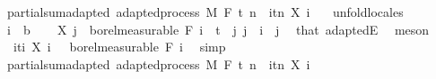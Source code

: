 \begin{isabellebody}
%
\endisadelimproof
\isanewline
\isanewline
{}\isamarkupfalse%
\ partial{\isacharunderscore}{\kern0pt}sum{\isacharunderscore}{\kern0pt}adapted{\isacharcolon}{\kern0pt}\ {\isachardoublequoteopen}adapted{\isacharunderscore}{\kern0pt}process\ M\ F\ t\ {\isacharparenleft}{\kern0pt}{\isasymlambda}n\ {\isasymxi}{\isachardot}{\kern0pt}\ {\isasymSum}i{\isasymin}{\isacharbraceleft}{\kern0pt}tn{\isacharbraceright}{\kern0pt}{\isachardot}{\kern0pt}\ X\ i\ {\isasymxi}{\isacharparenright}{\kern0pt}{\isachardoublequoteclose}\ \isanewline
%
\isadelimproof
%
\endisadelimproof
%
\isatagproof
{}\isamarkupfalse%
\ {\isacharparenleft}{\kern0pt}unfold{\isacharunderscore}{\kern0pt}locales{\isacharparenright}{\kern0pt}\isanewline
\ \ \isamarkupfalse%
\ i\ {\isacharcolon}{\kern0pt}{\isacharcolon}{\kern0pt}\ {\isacharprime}{\kern0pt}b\isanewline
\ \ \isamarkupfalse%
\ {\isachardoublequoteopen}X\ j\ {\isasymin}\ borel{\isacharunderscore}{\kern0pt}measurable\ {\isacharparenleft}{\kern0pt}F\ i{\isacharparenright}{\kern0pt}{\isachardoublequoteclose}\ \ {\isachardoublequoteopen}t\ {\isasymle}\ j{\isachardoublequoteclose}\ {\isachardoublequoteopen}j\ {\isasymle}\ i{\isachardoublequoteclose}\ \ j\ \isamarkupfalse%
\ that\ adaptedE\ \isamarkupfalse%
\ meson\isanewline
\ \ \isamarkupfalse%
\ {\isachardoublequoteopen}{\isacharparenleft}{\kern0pt}{\isasymlambda}{\isasymxi}{\isachardot}{\kern0pt}\ {\isasymSum}i{\isasymin}{\isacharbraceleft}{\kern0pt}ti{\isacharbraceright}{\kern0pt}{\isachardot}{\kern0pt}\ X\ i\ {\isasymxi}{\isacharparenright}{\kern0pt}\ {\isasymin}\ borel{\isacharunderscore}{\kern0pt}measurable\ {\isacharparenleft}{\kern0pt}F\ i{\isacharparenright}{\kern0pt}{\isachardoublequoteclose}\ \isamarkupfalse%
\ simp\isanewline
{}\isamarkupfalse%
%
\endisatagproof
{\isafoldproof}%
%
\isadelimproof
\isanewline
%
\endisadelimproof
\isanewline
{}\isamarkupfalse%
\ partial{\isacharunderscore}{\kern0pt}sum{\isacharprime}{\kern0pt}{\isacharunderscore}{\kern0pt}adapted{\isacharcolon}{\kern0pt}\ {\isachardoublequoteopen}adapted{\isacharunderscore}{\kern0pt}process\ M\ F\ t\ {\isacharparenleft}{\kern0pt}{\isasymlambda}n\ {\isasymxi}{\isachardot}{\kern0pt}\ {\isasymSum}i{\isasymin}{\isacharbraceleft}{\kern0pt}tn{\isacharbraceright}{\kern0pt}{\isachardot}{\kern0pt}\ X\ i\ {\isasymxi}{\isacharparenright}{\kern0pt}{\isachardoublequoteclose}\ \isanewline

\end{isabellebody}
